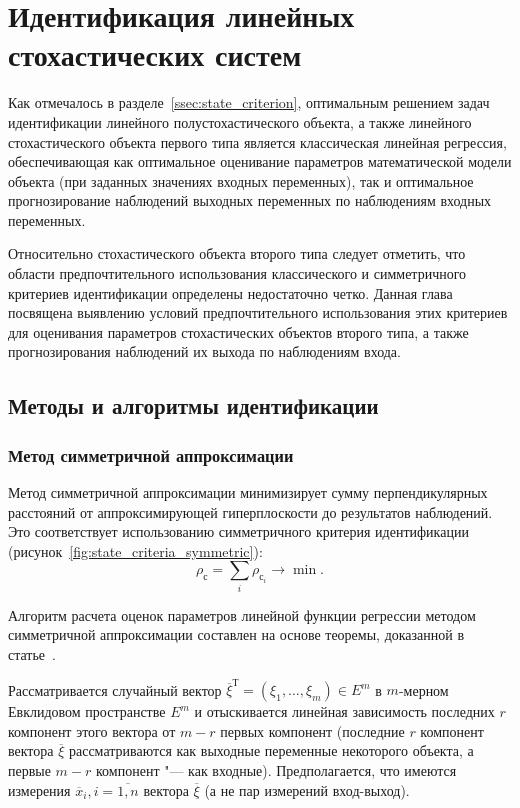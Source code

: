 \chapter[Идентификация линейных стохастических систем]{%
  Идентификация линейных \chapternewline%
  стохастических систем
}

Как отмечалось в разделе~\ref{ssec:state_criterion},
оптимальным решением задач идентификации линейного полустохастического объекта,
а также линейного стохастического объекта первого типа является классическая линейная регрессия,
обеспечивающая как оптимальное оценивание параметров математической модели объекта
(при заданных значениях входных переменных),
так и оптимальное прогнозирование наблюдений выходных переменных по наблюдениям входных переменных.

Относительно стохастического объекта второго типа следует отметить,
что области предпочтительного использования классического и симметричного критериев идентификации
определены недостаточно четко.
Данная глава посвящена выявлению условий предпочтительного использования этих критериев
для оценивания параметров стохастических объектов второго типа,
а также прогнозирования наблюдений их выхода по наблюдениям входа.

\section{Методы и алгоритмы идентификации}

\subsection{Метод симметричной аппроксимации}\label{ssec:linear_method_symmetric}

Метод симметричной аппроксимации минимизирует сумму перпендикулярных расстояний
от аппроксимирующей гиперплоскости до результатов наблюдений.
Это соответствует использованию симметричного критерия идентификации
(рисунок~\ref{fig:state_criteria_symmetric}):
\begin{equation*}
  \rho_{\text{с}} = \sum_i \rho_{\text{с}_i} \rightarrow \min.
\end{equation*}

Алгоритм расчета оценок параметров линейной функции регрессии
методом симметричной аппроксимации составлен на основе теоремы, доказанной в статье~\cite{mukha_2016}.

Рассматривается случайный вектор \( \overline{\xi}^{\text{Т}} = (\xi_1, \ldots, \xi_m ) \in E^m \)
в \( m \)-мерном Евклидовом пространстве \( E^m \) и отыскивается линейная
зависимость последних \( r \) компонент этого вектора от \( m - r \) первых компонент
(последние \( r \) компонент вектора \( \overline{\xi} \) рассматриваются как выходные
переменные некоторого объекта, а первые \( m - r \) компонент "--- как входные).
Предполагается, что имеются измерения \( \overline{x}_i, i = \overline{1, n} \)
вектора \( \overline{\xi} \) (а не пар измерений вход-выход).

